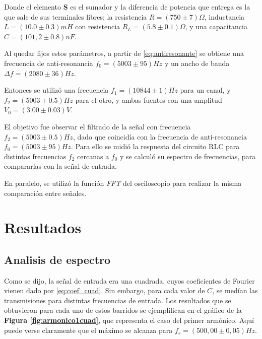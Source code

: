 \documentclass[11pt,a4paper]{article}
\begin{document}
Donde el elemento \textbf{S} es el sumador y la diferencia de potencia que entrega es la que sale de sus terminales libres; la resistencia $R=(750 \pm 7)\Omega$, inductancia $L=(10.0 \pm 0.3)mH$ con resistencia $R_L =(5.8 \pm 0.1)\Omega$, y una capacitancia $C=(101,2 \pm 0.8)nF$.

Al quedar fijos estos parámetros, a partir de \eqref{eq:antiresonante} se obtiene una frecuencia de anti-resonancia $f_0 = (5003 \pm 95)Hz$ y un ancho de banda $\Delta f = (2080 \pm 36)Hz$.

Entonces se utilizó una frecuencia $f_1=(10844 \pm 1)Hz$ para un canal, y $f_2=(5003\pm 0.5)Hz$ para el otro, y ambas fuentes con una amplitud $V_0=(3.00 \pm 0.03)V$.

El objetivo fue observar el filtrado de la señal con frecuencia $f_2=(5003\pm 0.5)Hz$, dado que coincidía con la frecuencia de anti-resonancia $f_0 = (5003 \pm 95)Hz$. Para ello se midió la respuesta del circuito RLC para distintas frecuencias $f_2$ cercanas a $f_0$ y se calculó su espectro de frecuencias, para compararlas con la señal de entrada.

En paralelo, se utilizó la función \textit{FFT} del osciloscopio para realizar la misma comparación entre señales.


\section{Resultados}
\label{sec:discusion}

\subsection{Analisis de espectro}
Como se dijo, la señal de entrada era una cuadrada, cuyos coeficientes de Fourier vienen dado por \eqref{eq:coef_cuad}. Sin embargo, para cada valor de $C$, se medían las transmisiones para distintas frecuencias de entrada. Los resultados que se obtuvieron para cada uno de estos barridos se ejemplifican en el gráfico de la \textbf{Figura \ref{fig:armonico1cuad}}, que representa el caso del primer armónico. Aquí puede verse claramente que el máximo se alcanza para $f_s = (500,00 \pm 0,05)Hz$.
\end{document}
